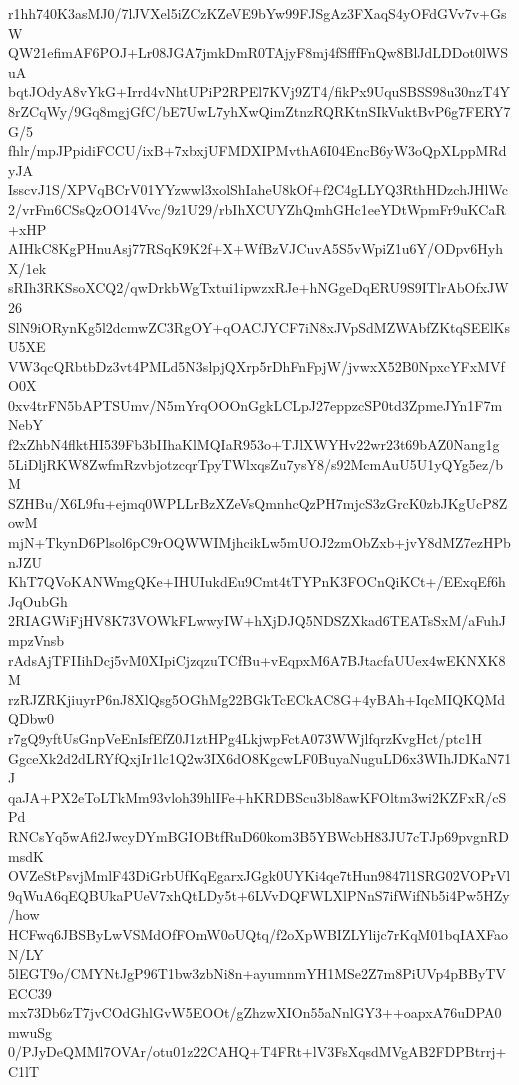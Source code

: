 r1hh740K3asMJ0/7lJVXel5iZCzKZeVE9bYw99FJSgAz3FXaqS4yOFdGVv7v+GsW
QW21efimAF6POJ+Lr08JGA7jmkDmR0TAjyF8mj4fSfffFnQw8BlJdLDDot0lWSuA
bqtJOdyA8vYkG+Irrd4vNhtUPiP2RPEl7KVj9ZT4/fikPx9UquSBSS98u30nzT4Y
8rZCqWy/9Gq8mgjGfC/bE7UwL7yhXwQimZtnzRQRKtnSIkVuktBvP6g7FERY7G/5
fhlr/mpJPpidiFCCU/ixB+7xbxjUFMDXIPMvthA6I04EncB6yW3oQpXLppMRdyJA
IsscvJ1S/XPVqBCrV01YYzwwl3xolShIaheU8kOf+f2C4gLLYQ3RthHDzchJHlWc
2/vrFm6CSsQzOO14Vvc/9z1U29/rbIhXCUYZhQmhGHc1eeYDtWpmFr9uKCaR+xHP
AIHkC8KgPHnuAsj77RSqK9K2f+X+WfBzVJCuvA5S5vWpiZ1u6Y/ODpv6HyhX/1ek
sRIh3RKSsoXCQ2/qwDrkbWgTxtui1ipwzxRJe+hNGgeDqERU9S9ITlrAbOfxJW26
SlN9iORynKg5l2dcmwZC3RgOY+qOACJYCF7iN8xJVpSdMZWAbfZKtqSEElKsU5XE
VW3qcQRbtbDz3vt4PMLd5N3slpjQXrp5rDhFnFpjW/jvwxX52B0NpxcYFxMVfO0X
0xv4trFN5bAPTSUmv/N5mYrqOOOnGgkLCLpJ27eppzcSP0td3ZpmeJYn1F7mNebY
f2xZhbN4flktHI539Fb3bIIhaKlMQIaR953o+TJlXWYHv22wr23t69bAZ0Nang1g
5LiDljRKW8ZwfmRzvbjotzcqrTpyTWlxqsZu7ysY8/s92McmAuU5U1yQYg5ez/bM
SZHBu/X6L9fu+ejmq0WPLLrBzXZeVsQmnhcQzPH7mjcS3zGrcK0zbJKgUcP8ZowM
mjN+TkynD6Plsol6pC9rOQWWIMjhcikLw5mUOJ2zmObZxb+jvY8dMZ7ezHPbnJZU
KhT7QVoKANWmgQKe+IHUIukdEu9Cmt4tTYPnK3FOCnQiKCt+/EExqEf6hJqOubGh
2RIAGWiFjHV8K73VOWkFLwwyIW+hXjDJQ5NDSZXkad6TEATsSxM/aFuhJmpzVnsb
rAdsAjTFIIihDcj5vM0XIpiCjzqzuTCfBu+vEqpxM6A7BJtacfaUUex4wEKNXK8M
rzRJZRKjiuyrP6nJ8XlQsg5OGhMg22BGkTcECkAC8G+4yBAh+IqcMIQKQMdQDbw0
r7gQ9yftUsGnpVeEnIsfEfZ0J1ztHPg4LkjwpFctA073WWjlfqrzKvgHct/ptc1H
GgceXk2d2dLRYfQxjIr1lc1Q2w3IX6dO8KgcwLF0BuyaNuguLD6x3WIhJDKaN71J
qaJA+PX2eToLTkMm93vloh39hlIFe+hKRDBScu3bl8awKFOltm3wi2KZFxR/cSPd
RNCsYq5wAfi2JwcyDYmBGIOBtfRuD60kom3B5YBWcbH83JU7cTJp69pvgnRDmsdK
OVZeStPsvjMmlF43DiGrbUfKqEgarxJGgk0UYKi4qe7tHun9847l1SRG02VOPrVl
9qWuA6qEQBUkaPUeV7xhQtLDy5t+6LVvDQFWLXlPNnS7ifWifNb5i4Pw5HZy/how
HCFwq6JBSByLwVSMdOfFOmW0oUQtq/f2oXpWBIZLYlijc7rKqM01bqIAXFaoN/LY
5lEGT9o/CMYNtJgP96T1bw3zbNi8n+ayumnmYH1MSe2Z7m8PiUVp4pBByTVECC39
mx73Db6zT7jvCOdGhlGvW5EOOt/gZhzwXIOn55aNnlGY3++oapxA76uDPA0mwuSg
0/PJyDeQMMl7OVAr/otu01z22CAHQ+T4FRt+lV3FsXqsdMVgAB2FDPBtrrj+C1lT
